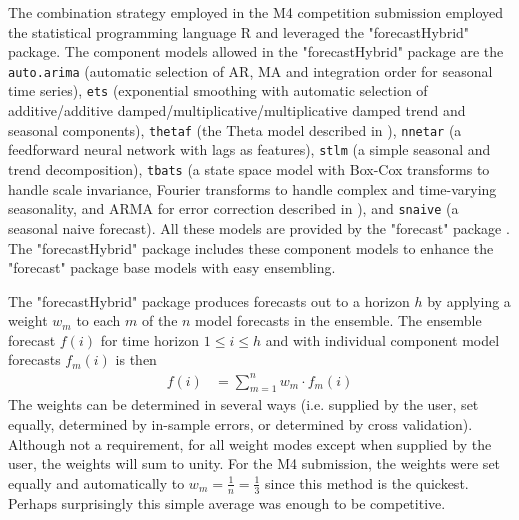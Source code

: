 \documentclass[11pt,3p,review,authoryear]{elsarticle}
\begin{document}
The combination strategy employed in the M4 competition submission employed the statistical programming language R \citep{Rlang} and leveraged the "forecastHybrid" \citep{forecastHybrid} package. The component models allowed in the "forecastHybrid" package are the  \lstinline{auto.arima} (automatic selection of AR, MA and integration order for seasonal time series), \lstinline{ets} (exponential smoothing with automatic selection of additive/additive damped/multiplicative/multiplicative damped trend and seasonal components), \lstinline{thetaf} (the Theta model described in \cite{THETA}), \lstinline{nnetar} (a feedforward neural network with lags as features), \lstinline{stlm} (a simple seasonal and trend decomposition), \lstinline{tbats} (a state space model with Box-Cox transforms to handle scale invariance, Fourier transforms to handle complex and time-varying seasonality, and ARMA for error correction described in \cite{TBATS}), and \lstinline{snaive} (a seasonal naive forecast). All these models are provided by the "forecast" package \citep{Forecast}. The "forecastHybrid" package includes these component models to enhance the "forecast" package base models with easy ensembling.

The "forecastHybrid" package produces forecasts out to a horizon $h$ by applying a weight $w_m$ to each $m$ of the $n$ model forecasts in the ensemble. The ensemble forecast $f(i)$ for time horizon $1 \leq i \leq h$ and with individual component model forecasts $f_m(i)$ is then
\begin{align}
f(i) & = \sum_{m=1}^n w_m\cdot f_m(i)
\end{align}
The weights can be determined in several ways (i.e. supplied by the user, set equally, determined by in-sample errors, or determined by cross validation). Although not a requirement, for all weight modes except when supplied by the user, the weights will sum to unity. For the M4 submission, the weights were set equally and automatically to $w_m = \frac{1}{n} = \frac{1}{3}$ since this method is the quickest. Perhaps surprisingly this simple average was enough to be competitive.
\end{document}
